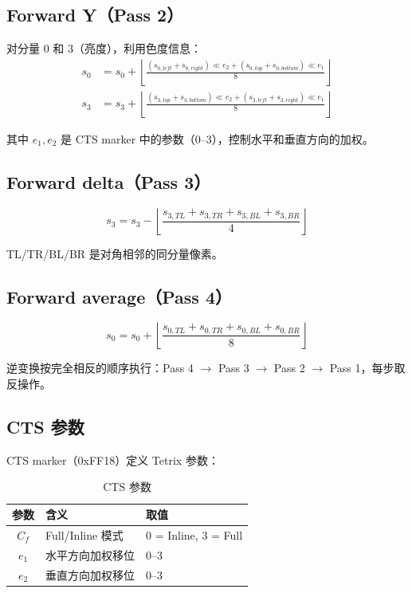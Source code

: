 \subsection{Forward Y（Pass 2）}

对分量 0 和 3（亮度），利用色度信息：
\begin{align}
s_0 &= s_0 + \left\lfloor \frac{(s_{0,\mathit{left}} + s_{0,\mathit{right}}) \ll e_2 + (s_{0,\mathit{top}} + s_{0,\mathit{bottom}}) \ll e_1}{8} \right\rfloor \\
s_3 &= s_3 + \left\lfloor \frac{(s_{3,\mathit{top}} + s_{3,\mathit{bottom}}) \ll e_2 + (s_{3,\mathit{left}} + s_{3,\mathit{right}}) \ll e_1}{8} \right\rfloor
\end{align}

其中 $e_1, e_2$ 是 CTS marker 中的参数（0--3），控制水平和垂直方向的加权。

\subsection{Forward delta（Pass 3）}

\begin{equation}
s_3 = s_3 - \left\lfloor \frac{s_{3,TL} + s_{3,TR} + s_{3,BL} + s_{3,BR}}{4} \right\rfloor
\end{equation}

TL/TR/BL/BR 是对角相邻的同分量像素。

\subsection{Forward average（Pass 4）}

\begin{equation}
s_0 = s_0 + \left\lfloor \frac{s_{0,TL} + s_{0,TR} + s_{0,BL} + s_{0,BR}}{8} \right\rfloor
\end{equation}

逆变换按完全相反的顺序执行：Pass 4 $\to$ Pass 3 $\to$ Pass 2 $\to$ Pass 1，每步取反操作。

\subsection{CTS 参数}

CTS marker（0xFF18）定义 Tetrix 参数：

\begin{table}[H]
\centering
\caption{CTS 参数}
\begin{tabular}{@{}cll@{}}
\toprule
参数 & 含义 & 取值 \\
\midrule
$C_f$ & Full/Inline 模式 & 0 = Inline, 3 = Full \\
$e_1$ & 水平方向加权移位 & 0--3 \\
$e_2$ & 垂直方向加权移位 & 0--3 \\
\bottomrule
\end{tabular}
\end{table}

